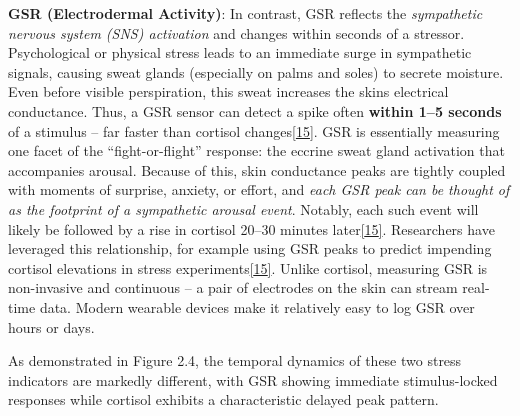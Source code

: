 \documentclass[12pt,a4paper]{article}
\begin{document}
\textbf{GSR (Electrodermal Activity)}: In contrast, GSR reflects the \emph{sympathetic nervous system (SNS) activation} and changes within seconds of a stressor. Psychological or physical stress leads to an immediate surge in sympathetic signals, causing sweat glands (especially on palms and soles) to secrete moisture. Even before visible perspiration, this sweat increases the skin\textquotesingle s electrical conductance. Thus, a GSR sensor can detect a spike often \textbf{within 1--5 seconds} of a stimulus -- far faster than cortisol changes\href{https://www.frontiersin.org/journals/computer-science/articles/10.3389/fcomp.2020.00039/full\#:~:text=Since\%20psychological\%20stress\%20results\%20in,Poh\%20et}{{[}15{]}}. GSR is essentially measuring one facet of the ``fight-or-flight'' response: the eccrine sweat gland activation that accompanies arousal. Because of this, skin conductance peaks are tightly coupled with moments of surprise, anxiety, or effort, and \emph{each GSR peak can be thought of as the footprint of a sympathetic arousal event}. Notably, each such event will likely be followed by a rise in cortisol 20--30 minutes later\href{https://www.frontiersin.org/journals/computer-science/articles/10.3389/fcomp.2020.00039/full\#:~:text=Since\%20psychological\%20stress\%20results\%20in,Poh\%20et}{{[}15{]}}. Researchers have leveraged this relationship, for example using GSR peaks to predict impending cortisol elevations in stress experiments\href{https://www.frontiersin.org/journals/computer-science/articles/10.3389/fcomp.2020.00039/full\#:~:text=Since\%20psychological\%20stress\%20results\%20in,Poh\%20et}{{[}15{]}}. Unlike cortisol, measuring GSR is non-invasive and continuous -- a pair of electrodes on the skin can stream real-time data. Modern wearable devices make it relatively easy to log GSR over hours or days.

As demonstrated in Figure 2.4, the temporal dynamics of these two stress indicators are markedly different, with GSR showing immediate stimulus-locked responses while cortisol exhibits a characteristic delayed peak pattern.
\end{document}
